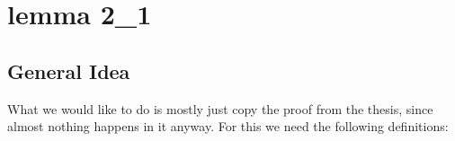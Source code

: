 \chapter{lemma 2_1}\label{ch_lemma2_1}

\section{General Idea}
What we would like to do is mostly just copy the proof from the thesis, since almost
nothing happens in it anyway. For this we need the following definitions:
